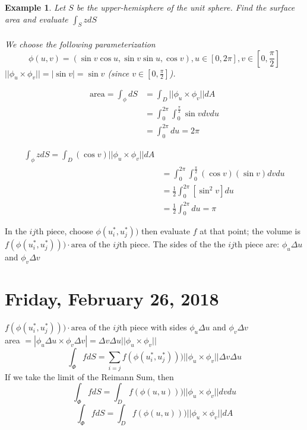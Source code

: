 \documentclass[12pt]{article}
\theoremstyle{plain}
\newtheorem{example}[theorem]{Example}
\theoremstyle{definition}
\begin{document}
\begin{example}
	Let $S$ be the upper-hemisphere of the unit sphere. Find the surface area and evaluate $\int_S z dS$\\
	\\
	We choose the following parameterization
	$$\phi (u,v) = (\sin v \cos u, \sin v \sin u, \cos v), u\in [0,2\pi], v\in [0,\frac{\pi}{2}]$$
	$||\phi_u \times \phi_v||=|\sin v|=\sin v$ (since $v\in [0,\frac{\pi}{2}]$).

	\begin{align*}
		\text{area} = \int_\phi dS &= \int_D ||\phi_u \times \phi_v|| dA\\
		&= \int^{2\pi}_0 \int_0^\frac{\pi}{2} \sin v dv du\\
		&= \int^{2\pi}_0 du = 2\pi
	\end{align*}

	\begin{align*}
		\int_\phi z dS = \int_D (\cos v) ||\phi_u \times \phi_v|| dA\\
		&= \int^{2\pi}_0 \int_0^\frac{\pi}{2} (\cos v)(\sin v) dv du\\
		&= \frac{1}{2} \int^{2\pi}_0 [\sin^2 v] du\\
		&= \frac{1}{2} \int^{2\pi}_0 du = \pi
	\end{align*}
\end{example}

In the $ij$th piece, choose $\phi (u_i^*, u_j^*))$ then evaluate $f$ at that point; the volume is $f(\phi (u_i^*, u_j^*)))\cdot \text{area of the $ij$th piece}$. The sides of the the $ij$th piece are: $\phi_u \Delta u$ and $\phi_v \Delta v$
\newpage

\section{Friday, February 26, 2018}

$f(\phi (u_i^*, u_j^*)))\cdot \text{area of the $ij$th piece}$ with sides $\phi_u \Delta u$ and $\phi_v \Delta v$\\
area $= |\phi_u \Delta u \times \phi_v \Delta v| = \Delta v \Delta u ||\phi_u \times \phi_v||$\\

$$\int_\Phi f dS = \sum_{i=j} f(\phi (u_i^*, u_j^*))) ||\phi_u \times \phi_v|| \Delta v \Delta u $$
If we take the limit of the Reimann Sum, then
$$\int_\Phi f dS = \int_D f(\phi (u, u))) ||\phi_u \times \phi_v|| d v d u$$
$$\int_\Phi f dS = \int_D f(\phi (u, u))) ||\phi_u \times \phi_v|| dA$$
\end{document}
